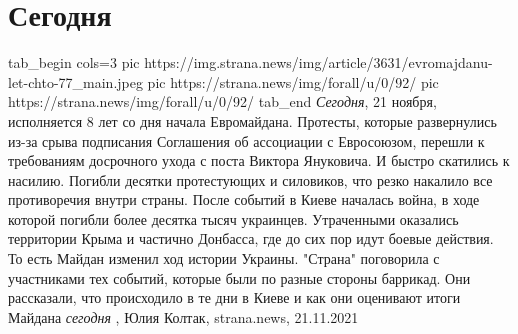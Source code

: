  
 
 
 
 
\chapter{Сегодня}

\ifcmt
  tab_begin cols=3
     pic https://img.strana.news/img/article/3631/evromajdanu-let-chto-77_main.jpeg
     pic https://strana.news/img/forall/u/0/92/%
		 pic https://strana.news/img/forall/u/0/92/%
  tab_end
\fi
\emph{Сегодня}, 21 ноября, исполняется 8 лет со дня начала Евромайдана.  Протесты,
которые развернулись из-за срыва подписания Соглашения об ассоциации с
Евросоюзом, перешли к требованиям досрочного ухода с поста Виктора Януковича.
И быстро скатились к насилию.  Погибли десятки протестующих и силовиков, что
резко накалило все противоречия внутри страны.  После событий в Киеве началась
война, в ходе которой погибли более десятка тысяч украинцев. Утраченными
оказались территории Крыма и частично Донбасса, где до сих пор идут боевые
действия.  То есть Майдан изменил ход истории Украины.  "Страна" поговорила с
участниками тех событий, которые были по разные стороны баррикад. Они
рассказали, что происходило в те дни в Киеве и как они оценивают итоги Майдана
\emph{сегодня}
, 
Юлия Колтак, strana.news, 21.11.2021

